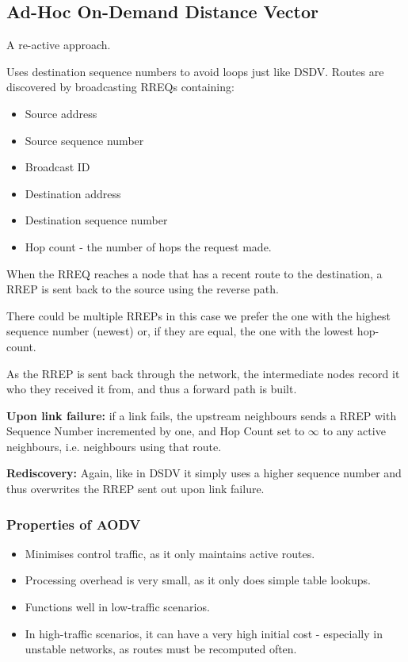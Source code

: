 	\subsection{Ad-Hoc On-Demand Distance Vector}
	A re-active approach.
	
	Uses destination sequence numbers to avoid loops just like DSDV. Routes are discovered by broadcasting \glspl{RREQ} containing:
	\begin{itemize}
		\item Source address
		\item Source sequence number
		\item Broadcast ID
		\item Destination address
		\item Destination sequence number
		\item Hop count - the number of hops the request made.
	\end{itemize}
	
	When the \gls{RREQ} reaches a node that has a recent route to the destination, a \gls{RREP} is sent back to the source using the reverse path.
	
	There could be multiple \glspl{RREP} in this case we prefer the one with the highest sequence number (newest) or, if they are equal, the one with the lowest hop-count.
	
	As the \gls{RREP} is sent back through the network, the intermediate nodes record it who they received it from, and thus a forward path is built.
	
	\textbf{Upon link failure:} if a link fails, the upstream neighbours sends a \gls{RREP} with Sequence Number incremented by one, and Hop Count set to $\infty$ to any active neighbours, i.e. neighbours using that route.
	
	\textbf{Rediscovery:} Again, like in DSDV it simply uses a higher sequence number and thus overwrites the \gls{RREP} sent out upon link failure.
	
	\subsubsection{Properties of AODV}
	\begin{itemize}
		\item Minimises control traffic, as it only maintains active routes.
		\item Processing overhead is very small, as it only does simple table lookups.
		\item Functions well in low-traffic scenarios.
		\item In high-traffic scenarios, it can have a very high initial cost - especially in unstable networks, as routes must be recomputed often.
	\end{itemize}
	
